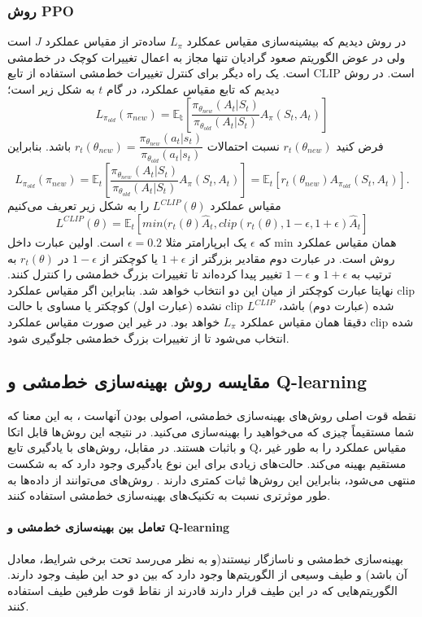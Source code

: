 \subsubsection{روش PPO}
در روش  دیدیم که بیشینه‌سازی مقیاس عمکلرد $L_\pi$ ساده‌تر از مقیاس عملکرد $J$ است ولی در عوض الگوریتم صعود گرادیان تنها مجاز به اعمال تغییرات کوچک در خط‌مشی است. یک راه دیگر برای کنترل تغییرات خط‌مشی استفاده از تابع CLIP است. در روش
  دیدیم که  تابع مقیاس عملکرد، در گام $t$ به شکل زیر است؛
$$L_{\pi_{old}}(\pi_{new}) = \mathbb{E_t}\left[\dfrac{\pi_{\theta_{new}}(A_t| S_t)}{\pi_{\theta_{old}}(A_t|S_t)} A_{\pi}(S_t, A_t)\right]$$
فرض کنید 
$r_t(\theta_{new})$
 نسبت احتمالات 
$r_t(\theta_{new}) = \dfrac{\pi_{\theta_{new}}(a_t|s_t)}{\pi_{\theta_{old}}(a_t|s_t)}$ باشد. بنابراین
$$L_{\pi_{old}}(\pi_{new}) = \mathbb{E}_t\left[\dfrac{\pi_{\theta_{new}}(A_t| S_t)}{\pi_{\theta_{old}}(A_t|S_t)} A_{\pi}(S_t, A_t)\right] = \mathbb{E}_t\left[r_t(\theta_{new}) A_{\pi_{old}}(S_t,A_t)\right].$$ مقیاس عملکرد  $L^{CLIP}(\theta)$ را به شکل زیر تعریف می‌کنیم
$$L^{CLIP}(\theta) = \mathbb{E}_t\left[min(r_t(\theta) \hat{A}_t, clip(r_t(\theta), 1-\epsilon, 1+\epsilon) \hat{A}_t \right]$$
که $\epsilon$ یک ابرپارامتر  مثلا 
$\epsilon=0.2$
است. اولین عبارت داخل min همان مقیاس عملکرد روش  است. در عبارت دوم مقادیر بزرگتر از $1+\epsilon$ یا کوچکتر از 
$1-\epsilon$
در $r_t(\theta)$ به ترتیب به $1+\epsilon$ و $1-\epsilon$ تغییر پیدا کرده‌اند تا تغییرات بزرگ خط‌مشی را کنترل کنند. نهایتا عبارت کوچکتر از میان این دو انتخاب خواهد شد. بنابراین اگر مقیاس عملکرد clip نشده (عبارت اول) کوچکتر یا مساوی با حالت clip شده (عبارت دوم) باشد، $L^{CLIP}$ دقیقا همان مقیاس عملکرد $L_\pi$ خواهد بود. در غیر این صورت مقیاس عملکرد clip شده انتخاب می‌شود تا از تغییرات بزرگ خط‌مشی جلوگیری شود.
\subsection{مقایسه روش بهینه‌سازی خط‌مشی و Q-learning}
نقطه قوت اصلی روش‌های بهینه‌سازی خط‌مشی، اصولی بودن آنهاست ، به این معنا که شما مستقیماً چیزی که می‌خواهید را بهینه‌سازی می‌کنید. در نتیجه این روش‌ها قابل اتکا و باثبات هستند. در مقابل، روش‌های 
با یادگیری تابع Q، مقیاس عملکرد را به طور غیر مستقیم بهینه می‌کند. حالت‌های زیادی برای این نوع یادگیری وجود دارد که به شکست منتهی می‌شود، بنابراین این روش‌ها  ثبات کمتری دارند 
\cite{suttonbook}.
روش‌های 
 می‌توانند از داده‌ها به طور موثرتری نسبت به تکنیک‌های بهینه‌سازی خط‌مشی استفاده کنند.
\paragraph{تعامل بین بهینه‌سازی خط‌مشی و Q-learning}
 بهینه‌سازی خط‌مشی و
 ناسازگار نیستند(و به نظر می‌رسد تحت برخی شرایط، معادل آن باشد) و طیف وسیعی از الگوریتم‌ها وجود دارد که بین دو حد این طیف وجود دارند. الگوریتم‌هایی که در این طیف قرار دارند قادرند از نقاط قوت  طرفین طیف استفاده کنند.
 
